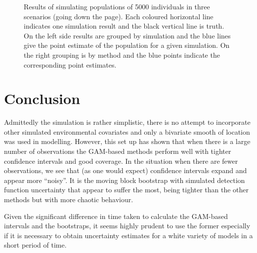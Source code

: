 \documentclass[11pt]{amsart}
\begin{document}
\begin{figure}
\begin{center}
\setlength{\tabcolsep}{0mm}
%
%
\caption{Results of simulating populations of 5000 individuals in three scenarios (going down the page). Each coloured horizontal line indicates one simulation result and the black vertical line is truth. On the left side results are grouped by simulation and the blue lines give the point estimate of the population for a given simulation. On the right grouping is by method and the blue points indicate the corresponding point estimates.}
\label{res-500}
\end{center}
\end{figure}

\section{Conclusion}

Admittedly the simulation is rather simplistic, there is no attempt to incorporate other simulated environmental covariates and only a bivariate smooth of location was used in modelling. However, this set up has shown that when there is a large number of observations the GAM-based methods perform well with tighter confidence intervals and good coverage. In the situation when there are fewer observations, we see that (as one would expect) confidence intervals expand and appear more ``noisy''. It is the moving block bootstrap with simulated detection function uncertainty that appear to suffer the most, being tighter than the other methods but with more chaotic behaviour.

Given the significant difference in time taken to calculate the GAM-based intervals and the bootstraps, it seems highly prudent to use the former especially if it is necessary to obtain uncertainty estimates for a white variety of models in a short period of time.


\end{document}
